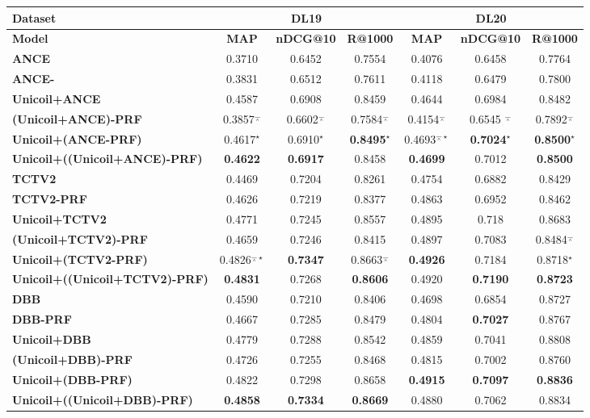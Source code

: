 \begin{tabular}{l|ccc|ccc}
	\toprule
	\textbf{Dataset}  &   \multicolumn{3}{c|}{\textbf{DL19}}& \multicolumn{3}{c}{\textbf{DL20}}     \\ \midrule
	\textbf{Model} &\textbf{MAP}  & \textbf{nDCG@10} &   \textbf{R@1000} & \textbf{MAP} &   \textbf{nDCG@10}   &    \textbf{R@1000}            \\ \midrule
	\textbf{ANCE}  &0.3710 & 0.6452   &0.7554  &    0.4076  & 0.6458 &   0.7764    \\
	\textbf{ANCE-\todo{VPRF}} &0.3831 & 0.6512   &0.7611  &    0.4118  & 0.6479 &   0.7800    \\
	\textbf{Unicoil+ANCE}&0.4587 &0.6908   &   0.8459 &0.4644&0.6984 &   0.8482    \\ \midrule
	\textbf{(Unicoil+ANCE)-PRF}   &0.3857${^\barwedge}$ & 0.6602${^\barwedge}$   & 0.7584${^\barwedge}$ &  0.4154${^\barwedge}$& 0.6545 ${^\barwedge}$ &0.7892${^\barwedge}$         \\
	\textbf{Unicoil+(ANCE-PRF)}   & 0.4617${^\star}$ &  0.6910${^\star}$   &    \textbf{0.8495}${^\star}$   &    0.4693${^{\barwedge\star}}$  & \textbf{0.7024}${^\star}$  & \textbf{0.8500}${^\star}$  \\
	\textbf{Unicoil+((Unicoil+ANCE)-PRF)}  &   \textbf{0.4622} & \textbf{0.6917}  &   0.8458 &    \textbf{0.4699}  & 0.7012 &   \textbf{0.8500}  \\ \midrule\midrule
	\textbf{TCTV2} &0.4469 & 0.7204   &0.8261  &    0.4754  & 0.6882 &   0.8429    \\
	\textbf{TCTV2-PRF}&0.4626 & 0.7219   &0.8377  &    0.4863  & 0.6952 &   0.8462    \\
	\textbf{Unicoil+TCTV2}   & 0.4771&0.7245&0.8557&0.4895&0.718&0.8683    \\ \midrule
	\textbf{(Unicoil+TCTV2)-PRF}  & 0.4659&0.7246&0.8415&0.4897&0.7083&0.8484${^\barwedge}$         \\
	\textbf{Unicoil+(TCTV2-PRF)}  & 0.4826${^{\barwedge\star}}$& \textbf{0.7347} & 0.8663${^\barwedge}$& \textbf{0.4926} & 0.7184&0.8718${^\star}$\\
	\textbf{Unicoil+((Unicoil+TCTV2)-PRF)} & \textbf{0.4831} & 0.7268 & \textbf{0.8606} & 0.4920 & \textbf{0.7190} & \textbf{0.8723}  \\ \midrule\midrule
	\textbf{DBB}   &0.4590 & 0.7210   &0.8406  &    0.4698  & 0.6854 &   0.8727    \\
	\textbf{DBB-PRF}  &0.4667 & 0.7285   &0.8479  &    0.4804  &    \textbf{0.7027} &   0.8767    \\
	\textbf{Unicoil+DBB} &0.4779 & 0.7288 & 0.8542 & 0.4859 & 0.7041 & 0.8808    \\ \midrule
	\textbf{(Unicoil+DBB)-PRF} &   0.4726&0.7255&0.8468&0.4815&0.7002&0.8760   \\
	\textbf{Unicoil+(DBB-PRF)} & 0.4822 & 0.7298 & 0.8658 & \textbf{0.4915} & \textbf{0.7097} & \textbf{0.8836}   \\
	\textbf{Unicoil+((Unicoil+DBB)-PRF)}   & \textbf{0.4858} & \textbf{0.7334} & \textbf{0.8669} & 0.4880 & 0.7062 & 0.8834            \\ \midrule\bottomrule
\end{tabular}